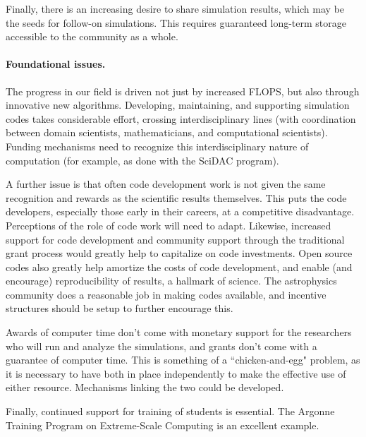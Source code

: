 \documentclass[11pt,twocolumn]{article}
\begin{document}
Finally, there is an increasing desire to share simulation results,
which may be the seeds for follow-on simulations.  This
requires guaranteed long-term storage accessible to the community as a
whole.

\paragraph*{Foundational issues.}

The progress in our field is driven not just by increased FLOPS, but
also through innovative new algorithms.  Developing, maintaining, and
supporting simulation codes takes considerable effort, crossing
interdisciplinary lines (with coordination between domain scientists,
mathematicians, and computational scientists).  Funding mechanisms
need to recognize this interdisciplinary nature of computation (for
example, as done with the SciDAC program).  

A further issue is that
often code development work is not given the same recognition and
rewards as the scientific results themselves.  This puts the code
developers, especially those early in their careers, at a competitive
disadvantage.  Perceptions of the role of code work will need to
adapt.  Likewise, increased support for code development and community
support through the traditional grant process would greatly help to
capitalize on code investments.  Open source codes also greatly help
amortize the costs of code development, and enable (and encourage)
reproducibility of results, a hallmark of science.  The astrophysics
community does a reasonable job in making codes available, and
incentive structures should be setup to further encourage this.

Awards of computer time don't come with monetary support for the
researchers who will run and analyze the simulations, and grants don't
come with a guarantee of computer time.  This is something of a
``chicken-and-egg" problem, as it is necessary to have both in place
independently to make the effective use of either resource.  Mechanisms
linking the two could be developed.

Finally, continued support for training of students is essential. The
Argonne Training Program on Extreme-Scale Computing is an excellent
example.
\end{document}
